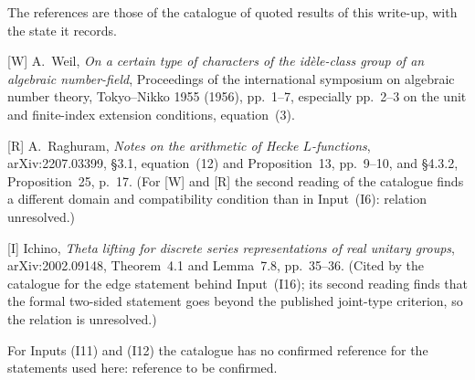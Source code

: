 \documentclass[11pt,a4paper]{article}
\newcommand{\head}[1]{\par\addvspace{17pt plus 4pt minus 2pt}\Needspace{6\baselineskip}%
  \noindent{\fontsize{13.2}{16}\selectfont\bfseries\color{ink}#1}\par\nopagebreak\vspace{-1pt}}
\theoremstyle{plainx}
\theoremstyle{uprightx}
\begin{document}
\head{References}
{\fontsize{9.4}{12.6}\selectfont
The references are those of the catalogue of quoted results of this write-up, with the state it records.

[W] A.~Weil, \emph{On a certain type of characters of the id\`ele-class group of an algebraic number-field},
Proceedings of the international symposium on algebraic number theory, Tokyo--Nikko 1955 (1956), pp.~1--7,
especially pp.~2--3 on the unit and finite-index extension conditions, equation~(3).

[R] A.~Raghuram, \emph{Notes on the arithmetic of Hecke $L$-functions}, arXiv:2207.03399, §3.1, equation~(12) and
Proposition~13, pp.~9--10, and §4.3.2, Proposition~25, p.~17. (For [W] and [R] the second reading of the
catalogue finds a different domain and compatibility condition than in Input~(I6): relation unresolved.)

[I] Ichino, \emph{Theta lifting for discrete series representations of real unitary groups}, arXiv:2002.09148,
Theorem~4.1 and Lemma~7.8, pp.~35--36. (Cited by the catalogue for the edge statement behind Input~(I16); its
second reading finds that the formal two-sided statement goes beyond the published joint-type criterion, so the
relation is unresolved.)

For Inputs (I11) and (I12) the catalogue has no confirmed reference for the statements used here: reference to be
confirmed.\par}
\end{document}
